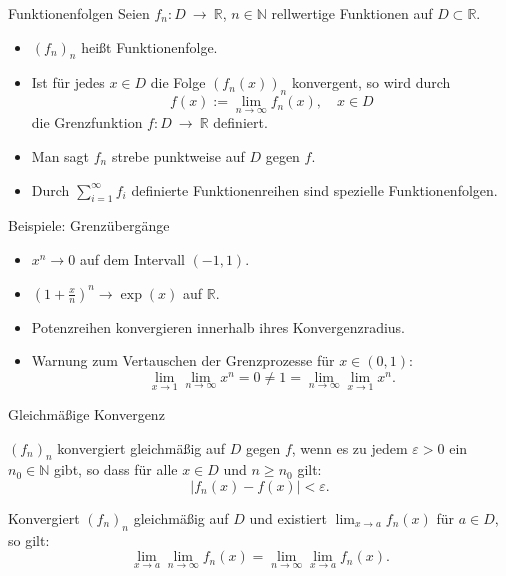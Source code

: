 \documentclass[notes=hide,hyperref={dvipdfmx,pdfpagelabels=false}]{beamer}
\begin{document}
\begin{frame}{Funktionenfolgen}
Seien $f_n: D \ \rightarrow \ \mathbb{R}$, $n \in
\mathbb{N}$  rellwertige Funktionen auf  $D \subset \mathbb{R}$.
\begin{itemize}
\item $(f_n)_n$ heißt {\color{red} Funktionenfolge.}
\item Ist für jedes $x\in D$ die Folge $(f_n(x))_n$ konvergent, so wird durch 
\[ f(x):= \lim_{n \rightarrow \infty} f_n(x), \quad x \in D \]
die {\color{red} Grenzfunktion} $f:D \ \rightarrow \ \mathbb{R}$ definiert.
\item Man sagt $f_n$ strebe {\color{red} punktweise} auf $D$ gegen $f$.  
\item Durch $\sum_{i=1}^\infty f_i$ definierte {\color{red} Funktionenreihen}
sind spezielle Funktionenfolgen.
\end{itemize}  
\end{frame}

\begin{frame}{Beispiele: Grenzübergänge}
\begin{itemize}
\item $x^n \rightarrow 0$ auf dem Intervall $(-1,1)$.
\item $\left( 1+ \frac{x}{n} \right)^n \rightarrow \exp(x)$ auf $\mathbb{R}$.
\item Potenzreihen konvergieren innerhalb ihres Konvergenzradius.
\item {\color{red} Warnung} zum Vertauschen der Grenzprozesse für $x \in (0,1)$:
\[ \lim_{x \rightarrow 1} \lim_{n \rightarrow \infty} x^n =0 \neq 1 = 
  \lim_{n \rightarrow \infty} \lim_{x \rightarrow 1} x^n.\]  
\end{itemize}
\end{frame}

\begin{frame}[fragile]{Gleichmäßige Konvergenz}
\begin{definition}
$(f_n)_n$ konvergiert {\color{red} gleichmäßig} auf $D$ gegen $f$, wenn es zu
jedem $\varepsilon >0$ ein $n_0 \in \mathbb{N}$ gibt, so dass für alle
$x \in D$ und $n\geq n_0$ gilt:
\[ |f_n(x) -f(x)| < \varepsilon.\]
\end{definition}

\begin{Satz}
 Konvergiert $(f_n)_n$ gleichmäßig auf $D$ und existiert $\lim_{x
\rightarrow a} f_n(x)$ für $a\in D$, so gilt:
\[ \lim_{x \rightarrow a} \lim_{n \rightarrow \infty} f_n(x) = \lim_{n
\rightarrow \infty} \lim_{x \rightarrow a} f_n(x). \]
\end{Satz}
\end{frame}
\end{document}
